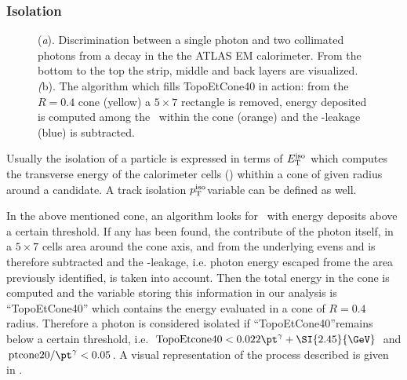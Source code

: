 \subsubsection{Isolation}
\label{sec:phisolation}
\begin{figure}[tp]
\centering
{} \quad
{} 
\caption{(\emph{a}). Discrimination between a single photon and two collimated photons from a \pizero decay in the the ATLAS EM calorimeter. From the bottom to the top the strip, middle and back layers are visualized. \\ \emph({b}). The algorithm which fills TopoEtCone40 in action: from the $R=0.4$ cone (yellow) a $5\times7$ rectangle is removed, energy deposited is computed among the \topo~within the cone (orange) and the \pt-leakage (blue) is subtracted.}
\end{figure}
Usually the isolation of a particle is expressed in terms of $E_\textup{T}^{\textup{iso}}$ which computes the transverse energy of the calorimeter cells (\topo) whithin a cone of given radius around a candidate. A track isolation $p_\textup{T}^{\textup{iso}}$variable can be defined as well.

In the above mentioned cone, an algorithm looks for \topo~with energy deposits above a certain threshold. If any has been found, the contribute of the photon itself, in a $5\times7$ cells area around the cone axis, and from the underlying evens and \pileup is therefore subtracted and the \pt-leakage, i.e. photon energy escaped frome the area previously identified, is taken into account. Then the total energy in the cone is computed and the variable storing this information in our analysis is ``TopoEtCone40'' which contains the energy evaluated in a cone of $R=0.4$ radius. Therefore a photon is considered isolated if ``TopoEtCone40''remains below a certain threshold, i.e. $\text{TopoEtcone40} < 0.022\pt^\gamma + \SI{2.45}{\GeV}$ and $\text{ptcone20}/\pt^\gamma<0.05$. A visual representation of the process described is given in \Fig{\ref{topoetcone40}}.

